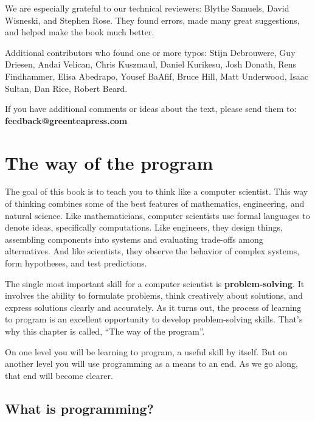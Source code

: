 \documentclass[12pt]{book}
\theoremstyle{exercise}
\begin{document}
We are especially grateful to our technical reviewers: Blythe Samuels, David Wisneski, and Stephen Rose.
They found errors, made many great suggestions, and helped make the book much better.

Additional contributors who found one or more typos: Stijn Debrouwere, Guy Driesen, Andai Velican, Chris Kuszmaul, Daniel Kurikesu, Josh Donath, Rens Findhammer, Elisa Abedrapo, Yousef BaAfif, Bruce Hill, Matt Underwood, Isaac Sultan, Dan Rice, Robert Beard.

If you have additional comments or ideas about the text, please send them to: {\bf feedback@greenteapress.com}


\mainmatter


\chapter{The way of the program}
\label{theway}

The goal of this book is to teach you to think like a computer scientist.
This way of thinking combines some of the best features of mathematics, engineering, and natural science.
Like mathematicians, computer scientists use formal languages to denote ideas, specifically computations.
Like engineers, they design things, assembling components into systems and evaluating trade-offs among alternatives.
And like scientists, they observe the behavior of complex systems, form hypotheses, and test predictions.


The single most important skill for a computer scientist is {\bf problem-solving}.
It involves the ability to formulate problems, think creatively about solutions, and express solutions clearly and accurately.
As it turns out, the process of learning to program is an excellent opportunity to develop problem-solving skills.
That's why this chapter is called, ``The way of the program''.

On one level you will be learning to program, a useful skill by itself.
But on another level you will use programming as a means to an end.
As we go along, that end will become clearer.


\section{What is programming?}

\end{document}
